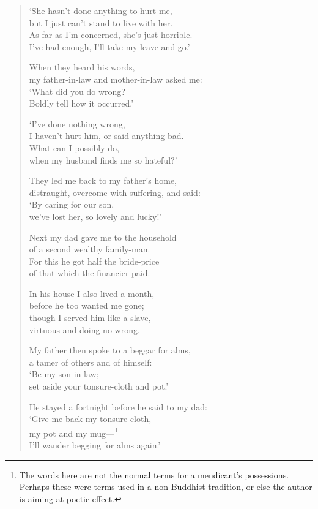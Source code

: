 \documentclass[12pt,openany]{book}%
\begin{document}
\begin{verse}
‘She hasn’t done anything to hurt me, \\
but I just can’t stand to live with her. \\
As far as I’m concerned, she’s just horrible. \\
I’ve had enough, I’ll take my leave and go.’ 

When they heard his words, \\
my father-in-law and mother-in-law asked me: \\
‘What did you do wrong? \\
Boldly tell how it occurred.’ 

‘I’ve done nothing wrong, \\
I haven’t hurt him, or said anything bad. \\
What can I possibly do, \\
when my husband finds me so hateful?’ 

They led me back to my father’s home, \\
distraught, overcome with suffering, and said: \\
‘By caring for our son, \\
we’ve lost her, so lovely and lucky!’ 

Next my dad gave me to the household \\
of a second wealthy family-man. \\
For this he got half the bride-price \\
of that which the financier paid. 

In his house I also lived a month, \\
before he too wanted me gone; \\
though I served him like a slave, \\
virtuous and doing no wrong. 

My father then spoke to a beggar for alms, \\
a tamer of others and of himself: \\
‘Be my son-in-law; \\
set aside your tonsure-cloth and pot.’ 

He stayed a fortnight before he said to my dad: \\
‘Give me back my tonsure-cloth, \\
my pot and my mug—\footnote{The words here are not the normal terms for a mendicant’s possessions. Perhaps these were terms used in a non-Buddhist tradition, or else the author is aiming at poetic effect. } \\
I’ll wander begging for alms again.’ 


\end{verse}
\end{document}
